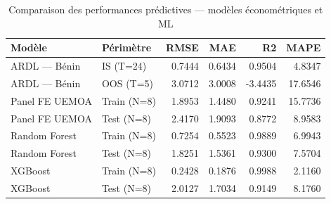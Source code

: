 \begin{table}
\caption{Comparaison des performances prédictives — modèles économétriques et ML}
\label{tab:comparaison_modeles}
\begin{tabular}{llrrrr}
\toprule
Modèle & Périmètre & RMSE & MAE & R2 & MAPE \\
\midrule
ARDL — Bénin & IS (T=24) & 0.7444 & 0.6434 & 0.9504 & 4.8347 \\
ARDL — Bénin & OOS (T=5) & 3.0712 & 3.0008 & -3.4435 & 17.6546 \\
Panel FE UEMOA & Train (N=8) & 1.8953 & 1.4480 & 0.9241 & 15.7736 \\
Panel FE UEMOA & Test (N=8) & 2.4170 & 1.9093 & 0.8772 & 8.9583 \\
Random Forest & Train (N=8) & 0.7254 & 0.5523 & 0.9889 & 6.9943 \\
Random Forest & Test (N=8) & 1.8251 & 1.5361 & 0.9300 & 7.5704 \\
XGBoost & Train (N=8) & 0.2428 & 0.1876 & 0.9988 & 2.1160 \\
XGBoost & Test (N=8) & 2.0127 & 1.7034 & 0.9149 & 8.1760 \\
\bottomrule
\end{tabular}
\end{table}
